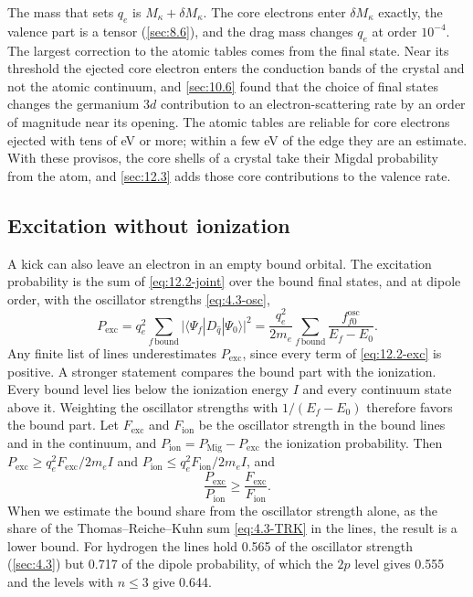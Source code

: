 The mass that sets $q_e$ is $M_\kappa + \delta M_\kappa$. The core electrons enter $\delta M_\kappa$ exactly, the valence part is a tensor (\cref{sec:8.6}), and the drag mass changes $q_e$ at order $10^{-4}$. The largest correction to the atomic tables comes from the final state. Near its threshold the ejected core electron enters the conduction bands of the crystal and not the atomic continuum, and \cref{sec:10.6} found that the choice of final states changes the germanium $3d$ contribution to an electron-scattering rate by an order of magnitude near its opening. The atomic tables are reliable for core electrons ejected with tens of eV or more; within a few eV of the edge they are an estimate. With these provisos, the core shells of a crystal take their Migdal probability from the atom, and \cref{sec:12.3} adds those core contributions to the valence rate.

\subsection{Excitation without ionization}\label{sec:12.2-excitation}

A kick can also leave an electron in an empty bound orbital. The excitation probability is the sum of \cref{eq:12.2-joint} over the bound final states, and at dipole order, with the oscillator strengths \cref{eq:4.3-osc},
\begin{equation}
  P_{\mathrm{exc}} = q_e^2\sum_{f\,\mathrm{bound}}\bigl|\langle\Psi_f|D_{\hat q}|\Psi_0\rangle\bigr|^2 = \frac{q_e^2}{2m_e}\sum_{f\,\mathrm{bound}}\frac{f^{\mathrm{osc}}_{f0}}{E_f - E_0} .
  \label{eq:12.2-exc}
\end{equation}
Any finite list of lines underestimates $P_{\mathrm{exc}}$, since every term of \cref{eq:12.2-exc} is positive. A stronger statement compares the bound part with the ionization. Every bound level lies below the ionization energy $I$ and every continuum state above it. Weighting the oscillator strengths with $1/(E_f - E_0)$ therefore favors the bound part. Let $F_{\mathrm{exc}}$ and $F_{\mathrm{ion}}$ be the oscillator strength in the bound lines and in the continuum, and $P_{\mathrm{ion}} = P_{\mathrm{Mig}} - P_{\mathrm{exc}}$ the ionization probability. Then $P_{\mathrm{exc}} \ge q_e^2F_{\mathrm{exc}}/2m_eI$ and $P_{\mathrm{ion}} \le q_e^2F_{\mathrm{ion}}/2m_eI$, and
\begin{equation}
  \frac{P_{\mathrm{exc}}}{P_{\mathrm{ion}}} \ge \frac{F_{\mathrm{exc}}}{F_{\mathrm{ion}}} .
  \label{eq:12.2-bound}
\end{equation}
When we estimate the bound share from the oscillator strength alone, as the share of the Thomas--Reiche--Kuhn sum \cref{eq:4.3-TRK} in the lines, the result is a lower bound. For hydrogen the lines hold 0.565 of the oscillator strength (\cref{sec:4.3}) but 0.717 of the dipole probability, of which the $2p$ level gives 0.555 and the levels with $n \le 3$ give 0.644.

